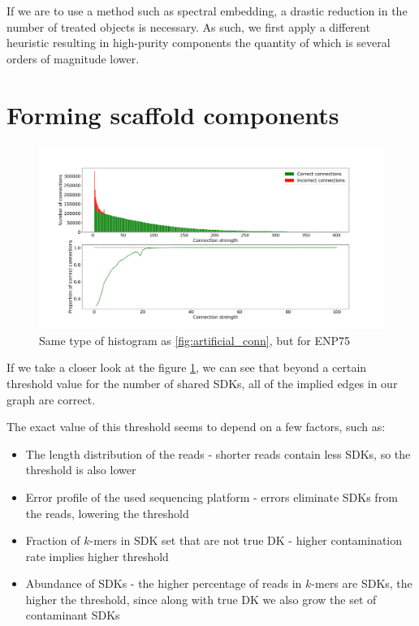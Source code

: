 If we are to use a method such as spectral embedding, a drastic reduction in the number of treated objects is necessary. As such, we first apply a different heuristic resulting in high-purity components the quantity of which is several orders of magnitude lower.

\section{Forming scaffold components}

\begin{figure}
\includegraphics[width=400bp]{figures/connections_initial.png}
\caption{Same type of histogram as \ref{fig:artificial_conn}, but for ENP75}
\label{fig:conn_init}
\end{figure}

If we take a closer look at the figure \ref{fig:conn_init}, we can see that beyond a certain threshold value for the number of shared SDKs, all of the implied edges in our graph are correct.

The exact value of this threshold seems to depend on a few factors, such as:
\begin{itemize}
	\item{The length distribution of the reads - shorter reads contain less SDKs, so the threshold is also lower}
	\item{Error profile of the used sequencing platform - errors eliminate SDKs from the reads, lowering the threshold}
	\item{Fraction of $k$-mers in SDK set that are not true DK - higher contamination rate implies higher threshold}
	\item{Abundance of SDKs - the higher percentage of reads in $k$-mers are SDKs, the higher the threshold, since along with true DK we also grow the set of contaminant SDKs}
\end{itemize}

